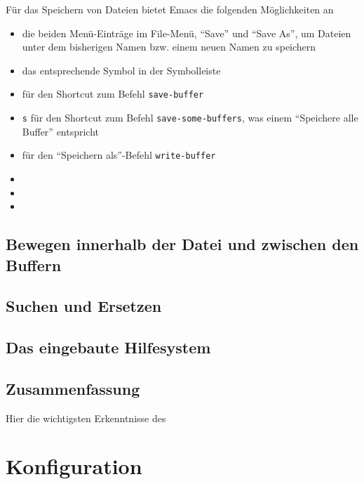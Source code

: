 \documentclass[12pt,ngerman]{scrbook}
\begin{document}
Für das Speichern von Dateien bietet Emacs die folgenden Möglichkeiten an

\begin{itemize}
	\item die beiden Menü-Einträge im File-Menü, \enquote{Save} und \enquote{Save As}, um Dateien unter dem bisherigen Namen bzw. einem neuen Namen zu speichern
	\item das entsprechende Symbol in der Symbolleiste

\item {}  für den Shortcut zum Befehl \texttt{save-buffer} 

\item {} \texttt{s} für den Shortcut zum Befehl \texttt{save-some-buffers}, was einem \enquote{Speichere alle Buffer} entspricht 
\item {}  für den \enquote{Speichern als}-Befehl \texttt{write-buffer}
\item 
\item 
\item 
\end{itemize}


\section{Bewegen innerhalb der Datei und zwischen den Buffern}

\section{Suchen und Ersetzen}

\section{Das eingebaute Hilfesystem}


\section{Zusammenfassung}

Hier die wichtigsten Erkenntnisse des 


\chapter{Konfiguration}

\end{document}
